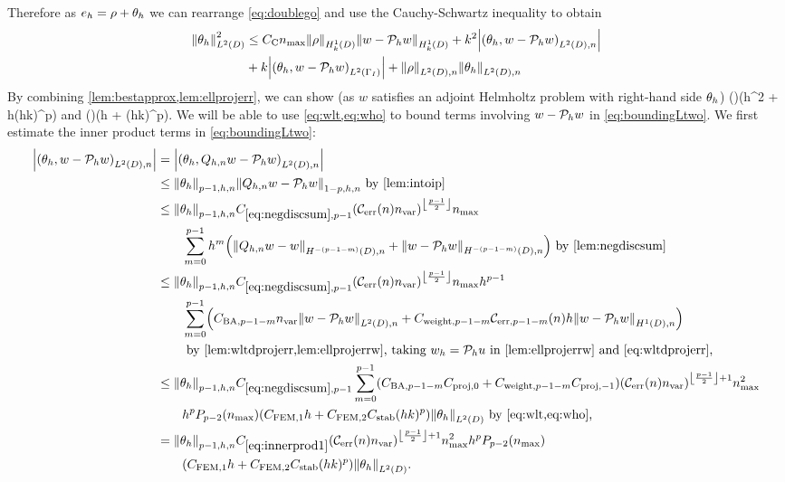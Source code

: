 Therefore as $e_{h} = \rho + \theta_{h}$ we can rearrange \cref{eq:doublego} and use the Cauchy-Schwartz inequality to obtain
\begin{align}
\NLtD{\thetah}^2 &\leq \Cc\nmax \NHokD{\rho} \NHokD{w- \Ph w} + k^2 \abs{\IPLtDn{\thetah}{w- \Ph w}}\nonumber\\
&+ k \abs{\IPLtGI{\thetah}{w-\Ph w}} + \NLtDn{\rho}\NLtDn{\thetah}\label{eq:boundingLtwo}
\end{align}
By combining \cref{lem:bestapprox,lem:ellprojerr}, we can show (as $w$ satisfies an adjoint Helmholtz problem with right-hand side $\theta_{h}$)
\beq\label{eq:wlt}
 \leq {} \mleft(\nmax\mright)\mleft(\CFEMotilde h^2 + \CFEMttilde \CAnk h(hk)^p\mright)\NLtD{\thetah}
\eeq
and
\beq\label{eq:who}
  \mleft(\nmax\mright)\mleft(\CFEMotilde h + \CFEMttilde \CAnk (hk)^p\mright)\NLtD{\thetah}.
\eeq
We will be able to use \cref{eq:wlt,eq:who} to bound terms involving $w - \mathcal P_{h} w$ in \cref{eq:boundingLtwo}. We first estimate the inner product terms in \cref{eq:boundingLtwo}:
\begin{align}
\abs{\IPLtDn{\thetah}{w- \Ph w}} &= \abs{\IPLtDn{\thetah}{\Qhn w - \Ph w}}\nonumber\\
&\leq \Nfn{p-1,h,n}{\thetah}\Nfn{1-p,h,n}{\Qhn w - \Ph w}\text{ by \cref{lem:intoip}}\nonumber\\
&\leq \Nfn{p-1,h,n}{\thetah} \Csumfn{p-1} \mleft(\En \nvar\mright)^{\floor{\frac{p-1}2}}\nmax\nonumber\\
&\quad\quad\sum_{m=0}^{p-1} h^{m}\mleft(\NHnfn{-(p-1-m)}{D}{\Qhn w - w}+ \NHnfn{-(p-1-m)}{D}{w - \Ph w}\mright) \text{ by \cref{lem:negdiscsum}}\nonumber\\
&\leq \Nfn{p-1,h,n}{\thetah} \Csumfn{p-1}\mleft(\En \nvar\mright)^{\floor{\frac{p-1}2}}\nmax h^{p-1}\nonumber\\
&\quad\quad\sum_{m=0}^{p-1} \mleft(\CSZfn{p-1-m}\nvar \NLtDn{w - \Ph w} + \Cwfn{p-1-m} \errn{p-1-m} h \NHoDn{w - \Ph w}\mright)\nonumber\\
&\quad\quad\text{ by \cref{lem:wltdprojerr,lem:ellprojerrw}, taking $\wh = \Ph u$ in \cref{lem:ellprojerrw} and \cref{eq:wltdprojerr},}\nonumber\\
&\leq \Nfn{p-1,h,n}{\thetah} \Csumfn{p-1}\sum_{m=0}^{p-1} \mleft(\CSZfn{p-1-m}\Cprojfn{0} + \Cwfn{p-1-m} \Cprojfn{-1}\mright)                         \mleft(\En \nvar\mright)^{\floor{\frac{p-1}2}+1}\nmax^2 \nonumber\\
&\quad\quad h^p \Pfn{p-2}\mleft(\nmax\mright)\mleft(\CFEMotilde h + \CFEMttilde \CAnk (hk)^p\mright) \NLtD{\thetah} \text{ by \cref{eq:wlt,eq:who},}\nonumber\\
&=\Nfn{p-1,h,n}{\thetah}  \Cfourteen \mleft(\En \nvar\mright)^{\floor{\frac{p-1}2}+1}\nmax^2 h^p \Pfn{p-2}\mleft(\nmax\mright)\nonumber\\
&\quad\quad\mleft(\CFEMotilde h + \CFEMttilde \CAnk (hk)^p\mright) \NLtD{\thetah} \label{eq:innerprod1}.
\end{align}

